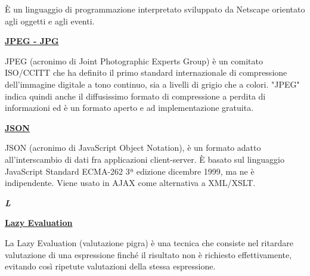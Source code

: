 \medskip
\begin{addmargin}[5em]{1em}
È un linguaggio di programmazione interpretato sviluppato da Netscape orientato agli oggetti e agli eventi.
\end{addmargin}
	
\bigskip
\begin{addmargin}[0em]{0em}	
	\textbf{\underline{JPEG - JPG}}
\end{addmargin}

\medskip
\begin{addmargin}[5em]{1em}
JPEG (acronimo di Joint Photographic Experts Group) è un comitato ISO/CCITT che ha definito il primo standard internazionale di compressione dell'immagine digitale a tono continuo, sia a livelli di grigio che a colori.
"JPEG" indica quindi anche il diffusissimo formato di compressione a perdita di informazioni ed è un formato aperto e ad implementazione gratuita.
\end{addmargin}	

\bigskip
\begin{addmargin}[0em]{0em}	
	\textbf{\underline{JSON}}
\end{addmargin}

\medskip
\begin{addmargin}[5em]{1em}
JSON (acronimo di JavaScript Object Notation), è un formato adatto all'interscambio di dati fra applicazioni client-server. È basato sul linguaggio JavaScript Standard ECMA-262 3ª edizione dicembre 1999, ma ne è indipendente. Viene usato in AJAX come alternativa a XML/XSLT.
\end{addmargin}

\newpage

\cleardoublepage
{}
{}
\noindent\hrulefill\hspace{4mm}\textbf{\textsl{\Huge{L}}}\hspace{4mm}\hrulefill

\vspace*{2\bigskipamount}

\begin{addmargin}[0em]{0em}	
	\textbf{\underline{Lazy Evaluation}}
\end{addmargin}

\medskip
\begin{addmargin}[5em]{1em}	
La Lazy Evaluation (valutazione pigra) è una tecnica che consiste nel ritardare valutazione di una espressione finché il risultato non è richiesto effettivamente, evitando così ripetute valutazioni della stessa espressione.
\end{addmargin}	



